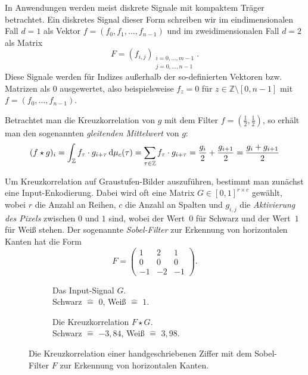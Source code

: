 \documentclass{article}
\theoremstyle{definition}
\newcommand{\Z}{\mathbb{Z}}
\newcommand{\diff}{\,\textrm{d}}
\begin{document}
In Anwendungen werden meist diskrete Signale mit kompaktem Träger betrachtet.
Ein diskretes Signal dieser Form schreiben wir im eindimensionalen Fall $d=1$ als Vektor $f = (f_0, f_1, \dots, f_{n-1})$ und im zweidimensionalen Fall $d=2$ als Matrix $$F = (f_{i,j})_{\substack{i=0,\dots,m-1\\ j=0,\dots, n-1}}.$$
Diese Signale werden für Indizes außerhalb der so-definierten Vektoren bzw. Matrizen als $0$ ausgewertet, also beispielsweise $f_z = 0$ für $z\in\Z\setminus[0,n-1]$ mit $f=(f_0, \dots, f_{n-1})$.

Betrachtet man die Kreuzkorrelation von $g$ mit dem Filter $f=(\frac{1}{2}, \frac{1}{2})$, so erhält man den sogenannten \emph{gleitenden Mittelwert} von $g$:
\[  
    (f \star g)_i = \int_\Z f_\tau \cdot g_{i + \tau} \diff \cmeasure(\tau) 
    = \sum_{\tau\in\Z} f_\tau \cdot g_{i+ \tau}
    = \frac{g_i}{2} + \frac{g_{i+1}}{2} = \frac{g_i + g_{i+1}}{2}
\]

Um Kreuzkorrelation auf Graustufen-Bilder auszuführen, bestimmt man zu\-nächst eine Input-Enkodierung.
Dabei wird oft eine Matrix $G\in[0,1]^{r\times c}$ gewählt, wobei $r$ die Anzahl an Reihen, $c$ die Anzahl an Spalten und $g_{i,j}$ die \emph{Aktivierung des Pixels} zwischen $0$ und $1$ sind, wobei der Wert~$0$ für Schwarz und der Wert~$1$ für Weiß stehen.
Der sogenannte \emph{Sobel-Filter} zur Erkennung von horizontalen Kanten hat die Form
\[
    F = \begin{pmatrix}
        1 & 2 & 1 \\
        0 & 0 & 0 \\ 
        -1 & -2 & -1
    \end{pmatrix}.
\]


\begin{figure}
    \begin{subfigure}{0.5\textwidth}
        \resizebox{\textwidth}{\textwidth}{
        
        }
        \caption{Das Input-Signal $G$.\\Schwarz $\hat=$ $0$, Weiß $\hat=$ $1$.}
    \end{subfigure}%
    \begin{subfigure}{0.5\textwidth}
        \resizebox{0.9285\textwidth}{0.9285\textwidth}{
        
        }
    \caption{Die Kreuzkorrelation $F\star G$.\\Schwarz $\hat=$ $-3{,}84$, Weiß $\hat=$ $3{,}98$.}
    \end{subfigure}
    \caption{Die Kreuzkorrelation einer handgeschriebenen Ziffer mit dem Sobel-Filter $F$ zur Erkennung von horizontalen Kanten.}
    \label{fig:sobel-on-mnist}
\end{figure}
\end{document}
